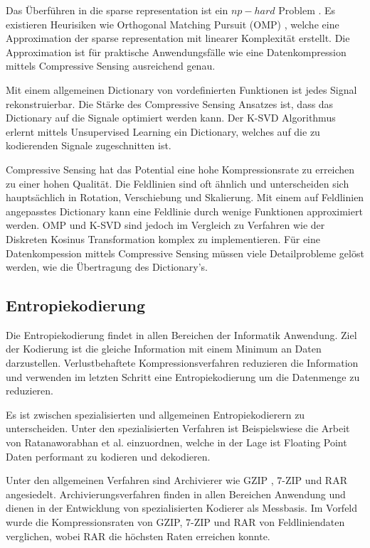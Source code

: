 Das Überführen in die sparse representation ist ein $np-hard$ Problem \cite{wiki:npHard}. Es existieren Heurisiken wie Orthogonal Matching Pursuit (OMP) \cite{tropp2007signal}, welche eine Approximation der sparse representation mit linearer Komplexität erstellt. Die Approximation ist für praktische Anwendungsfälle wie eine Datenkompression mittels Compressive Sensing ausreichend genau.

Mit einem allgemeinen Dictionary von vordefinierten Funktionen ist jedes Signal rekonstruierbar. Die Stärke des Compressive Sensing Ansatzes ist, dass das Dictionary auf die Signale optimiert werden kann. Der K-SVD \cite{bryt2008compression} Algorithmus erlernt mittels Unsupervised Learning ein Dictionary, welches auf die zu kodierenden Signale zugeschnitten ist. 

Compressive Sensing hat das Potential eine hohe Kompressionsrate zu erreichen zu einer hohen Qualität. Die Feldlinien sind oft ähnlich und unterscheiden sich hauptsächlich in Rotation, Verschiebung und Skalierung. Mit einem auf Feldlinien angepasstes Dictionary kann eine Feldlinie durch wenige Funktionen approximiert werden. OMP und K-SVD sind jedoch im Vergleich zu Verfahren wie der Diskreten Kosinus Transformation komplex zu implementieren. Für eine Datenkompession mittels Compressive Sensing müssen viele Detailprobleme gelöst werden, wie die Übertragung des Dictionary's.

\subsection{Entropiekodierung}
Die Entropiekodierung findet in allen Bereichen der Informatik Anwendung. Ziel der Kodierung ist die gleiche Information mit einem Minimum an Daten darzustellen. Verlustbehaftete Kompressionsverfahren reduzieren die Information und verwenden im letzten Schritt eine Entropiekodierung um die Datenmenge zu reduzieren.

Es ist zwischen spezialisierten und allgemeinen Entropiekodierern zu unterscheiden. Unter den spezialisierten Verfahren ist Beispielswiese die Arbeit von Ratanaworabhan et al. \cite{ratanaworabhan2006fast} einzuordnen, welche in der Lage ist Floating Point Daten performant zu kodieren und dekodieren.
 
Unter den allgemeinen Verfahren sind Archivierer wie GZIP \cite{website:gzip}, 7-ZIP \cite{website:7zip} und RAR \cite{website:rar} angesiedelt. Archivierungsverfahren finden in allen Bereichen Anwendung und dienen in der Entwicklung von spezialisierten Kodierer als Messbasis. Im Vorfeld wurde die Kompressionsraten von GZIP, 7-ZIP und RAR von Feldliniendaten verglichen, wobei RAR die höchsten Raten erreichen konnte.

